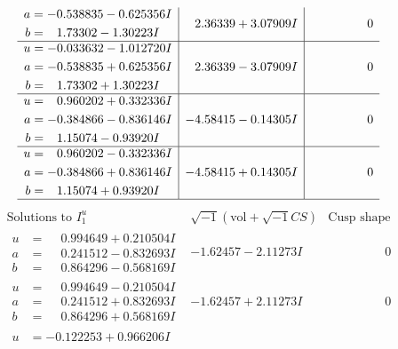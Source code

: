 \documentclass[1p]{elsarticle_modified}
\theoremstyle{definition}
\newcommand{\I}{\sqrt{-1}}
\begin{document}
$$\begin{array}{c|c|c}
\begin{aligned}
a &= -0.538835 - 0.625356 I \\
b &= \phantom{-}1.73302 - 1.30223 I\end{aligned}
 & \phantom{-}2.36339 + 3.07909 I & \phantom{-0.000000 } 0 \\ \hline\begin{aligned}
u &= -0.033632 - 1.012720 I \\
a &= -0.538835 + 0.625356 I \\
b &= \phantom{-}1.73302 + 1.30223 I\end{aligned}
 & \phantom{-}2.36339 - 3.07909 I & \phantom{-0.000000 } 0 \\ \hline\begin{aligned}
u &= \phantom{-}0.960202 + 0.332336 I \\
a &= -0.384866 - 0.836146 I \\
b &= \phantom{-}1.15074 - 0.93920 I\end{aligned}
 & -4.58415 - 0.14305 I & \phantom{-0.000000 } 0 \\ \hline\begin{aligned}
u &= \phantom{-}0.960202 - 0.332336 I \\
a &= -0.384866 + 0.836146 I \\
b &= \phantom{-}1.15074 + 0.93920 I\end{aligned}
 & -4.58415 + 0.14305 I & \phantom{-0.000000 } 0\\
 \hline 
 \end{array}$$\newpage$$\begin{array}{c|c|c}  
\text{Solutions to }I^u_{1}& \I (\text{vol} + \sqrt{-1}CS) & \text{Cusp shape}\\
 \hline 
\begin{aligned}
u &= \phantom{-}0.994649 + 0.210504 I \\
a &= \phantom{-}0.241512 - 0.832693 I \\
b &= \phantom{-}0.864296 - 0.568169 I\end{aligned}
 & -1.62457 - 2.11273 I & \phantom{-0.000000 } 0 \\ \hline\begin{aligned}
u &= \phantom{-}0.994649 - 0.210504 I \\
a &= \phantom{-}0.241512 + 0.832693 I \\
b &= \phantom{-}0.864296 + 0.568169 I\end{aligned}
 & -1.62457 + 2.11273 I & \phantom{-0.000000 } 0 \\ \hline\begin{aligned}
u &= -0.122253 + 0.966206 I \\

\end{aligned}
\end{array}$$
\end{document}
